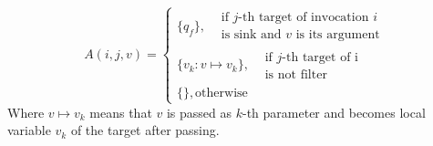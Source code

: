 \begin{equation}
	\label{fig:FunctionA}
	A(i, j, v) = 
	\begin{cases}
		\{q_f\},  \begin{split}&\textrm{if $j$-th target of invocation $i$} \\ & \textrm{is sink and $v$ is its argument}\end{split} \\
			\{v_k: v \mapsto v_k\}, \begin{split}&\textrm{if $j$-th target of i} \\ & \textrm{is not filter}\end{split} \\
		\{\}, \textrm{otherwise}
	\end{cases}
\end{equation}
Where $v \mapsto v_k$ means that $v$ is passed as $k$-th parameter and becomes local variable $v_k$ of the target after passing.
